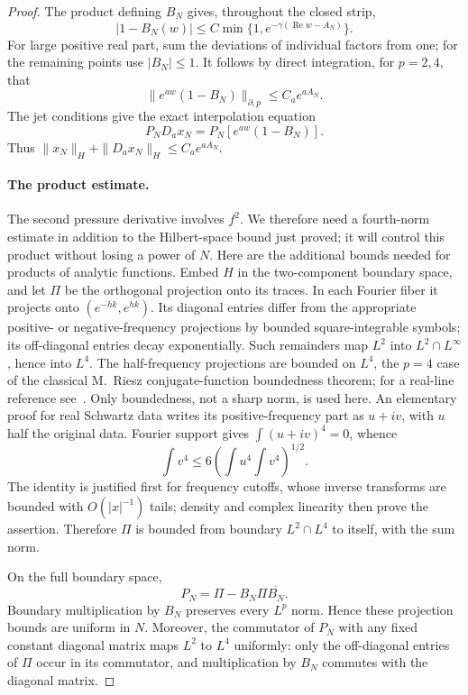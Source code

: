 \begin{proof}
The product defining \(B_N\) gives, throughout the closed strip,
\begin{equation}
 |1-B_N(w)|\le C\min\{1,e^{-\gamma(\operatorname{Re}w-A_N)}\}.
 \label{eq:05-blaschke-tail}
\end{equation}
For large positive real part, sum the deviations of individual factors from one; for the remaining points use \(|B_N|\le1\). It follows by direct integration, for \(p=2,4\), that
\[
 \|e^{aw}(1-B_N)\|_{\partial,p}\le C_a e^{aA_N}.
\]
The jet conditions give the exact interpolation equation
\begin{equation}
 P_ND_ax_N=P_N[e^{aw}(1-B_N)].
 \label{eq:05-first-interpolation}
\end{equation}
Thus \(\|x_N\|_H+\|D_ax_N\|_H\le C_ae^{aA_N}\).

\paragraph{The product estimate.}
The second pressure derivative involves \(f^2\). We therefore need a
fourth-norm estimate in addition to the Hilbert-space bound just proved;
it will control this product without losing a power of \(N\).
Here are the additional bounds needed for products of analytic functions. Embed \(H\) in the two-component boundary space, and let \(\Pi\) be the orthogonal projection onto its traces. In each Fourier fiber it projects onto \((e^{-hk},e^{hk})\). Its diagonal entries differ from the appropriate positive- or negative-frequency projections by bounded square-integrable symbols; its off-diagonal entries decay exponentially. Such remainders map \(L^2\) into \(L^2\cap L^\infty\), hence into \(L^4\). The half-frequency projections are bounded on \(L^4\), the \(p=4\) case of the classical M.~Riesz conjugate-function boundedness theorem; for a real-line reference see~\cite{Grafakos1997,GrafakosSavage2015}. Only boundedness, not a sharp norm, is used here. An elementary proof for real Schwartz data writes its positive-frequency part as \(u+iv\), with \(u\) half the original data. Fourier support gives \(\int(u+iv)^4=0\), whence
\[
 \int v^4\le6\left(\int u^4\int v^4\right)^{1/2}.
\]
The identity is justified first for frequency cutoffs, whose inverse transforms are bounded with \(O(|x|^{-1})\) tails; density and complex linearity then prove the assertion. Therefore \(\Pi\) is bounded from boundary \(L^2\cap L^4\) to itself, with the sum norm.

On the full boundary space,
\[
 P_N=\Pi-B_N\Pi\overline{B_N}.
\]
Boundary multiplication by \(B_N\) preserves every \(L^p\) norm. Hence these projection bounds are uniform in \(N\). Moreover, the commutator of \(P_N\) with any fixed constant diagonal matrix maps \(L^2\) to \(L^4\) uniformly: only the off-diagonal entries of \(\Pi\) occur in its commutator, and multiplication by \(B_N\) commutes with the diagonal matrix.


\end{proof}
